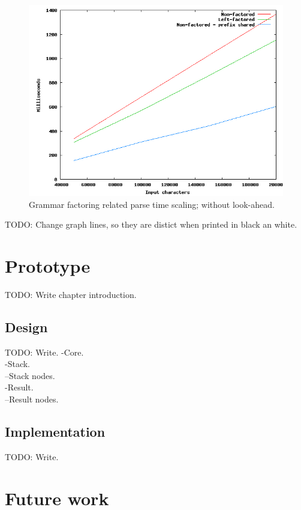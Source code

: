 \documentclass[a4paper,10pt]{article}
\begin{document}
\begin{figure}[H]
\centering
\includegraphics[scale=0.5]{grammar-factoring.png}
\caption{Grammar factoring related parse time scaling; without look-ahead.}
\end{figure}

TODO: Change graph lines, so they are distict when printed in black an white.

\section{Prototype}

TODO: Write chapter introduction.

\subsection{Design}

TODO: Write.
-Core.\\
-Stack.\\
--Stack nodes.\\
-Result.\\
--Result nodes.

\subsection{Implementation}

TODO: Write.

\section{Future work}
\end{document}
